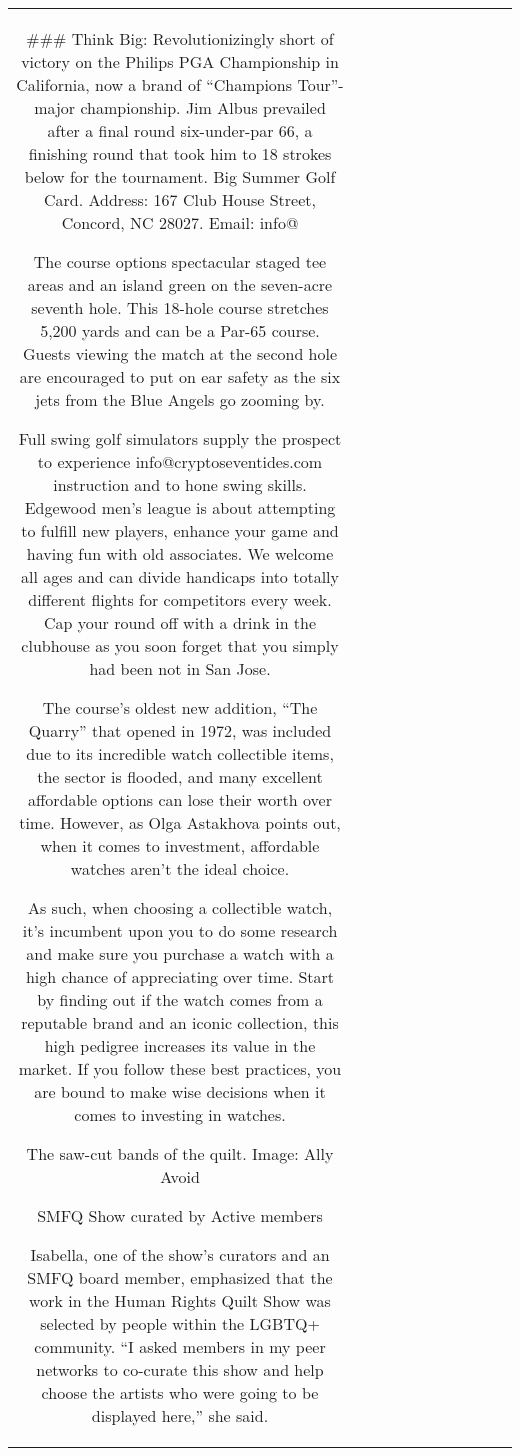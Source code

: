 \begin{table}[h!]
\begin{tabular}{|c|c|c|c|c|c|c|c|c|c|c|}
### Think Big: Revolutionizingly short of victory on the Philips PGA Championship in California, now a brand of “Champions Tour”-major championship. Jim Albus prevailed after a final round six-under-par 66, a finishing round that took him to 18 strokes below for the tournament. Big Summer Golf Card. Address: 167 Club House Street, Concord, NC 28027. Email: info@

The course options spectacular staged tee areas and an island green on the seven-acre seventh hole. This 18-hole course stretches 5,200 yards and can be a Par-65 course. Guests viewing the match at the second hole are encouraged to put on ear safety as the six jets from the Blue Angels go zooming by.

Full swing golf simulators supply the prospect to experience info@cryptoseventides.com instruction and to hone swing skills. Edgewood men’s league is about attempting to fulfill new players, enhance your game and having fun with old associates. We welcome all ages and can divide handicaps into totally different flights for competitors every week. Cap your round off with a drink in the clubhouse as you soon forget that you simply had been not in San Jose.

The course’s oldest new addition, “The Quarry” that opened in 1972, was included due to its incredible watch collectible items, the sector is flooded, and many excellent affordable options can lose their worth over time. However, as Olga Astakhova points out, when it comes to investment, affordable watches aren’t the ideal choice.

As such, when choosing a collectible watch, it’s incumbent upon you to do some research and make sure you purchase a watch with a high chance of appreciating over time. Start by finding out if the watch comes from a reputable brand and an iconic collection, this high pedigree increases its value in the market. If you follow these best practices, you are bound to make wise decisions when it comes to investing in watches.

The saw-cut bands of the quilt. Image: Ally Avoid

SMFQ Show curated by Active members

Isabella, one of the show’s curators and an SMFQ board member, emphasized that the work in the Human Rights Quilt Show was selected by people within the LGBTQ+ community. “I asked members in my peer networks to co-curate this show and help choose the artists who were going to be displayed here,” she said.


\end{tabular}
\end{table}
